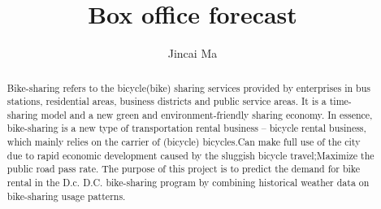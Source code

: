 \documentclass{amsart}
\begin{document}
%
%
\title[A Short Running Title]{ Box office forecast}%

\author{Jincai Ma}
\address[A.~1]{School of Computer Science,\\ 
Xi'an Shiyou University, Shaanxi 710065, China}%


%
\date{\gitAuthorDate}%

\begin{abstract}
    Bike-sharing refers to the bicycle(bike) sharing services provided by enterprises in bus stations, residential areas, business districts and public service areas. It is a time-sharing model and a new green and environment-friendly sharing economy.
In essence, bike-sharing is a new type of transportation rental business -- bicycle rental business, which mainly relies on the carrier of (bicycle) bicycles.Can make full use of the city due to rapid economic development caused by the sluggish bicycle travel;Maximize the public road pass rate.
The purpose of this project is to predict the demand for bike rental in the D.c. D.C. bike-sharing program by combining historical weather data on bike-sharing usage patterns.\\
    
\end{abstract}

\maketitle
\tableofcontents

\newpage



\newpage




\listoftodos
\end{document}
